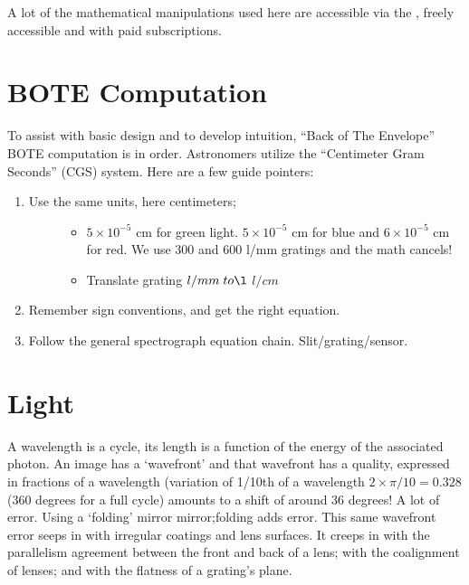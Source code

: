 \documentclass[letterpaper,10pt,english,openany,oneside]{sphinxmanual}
\begin{document}
\sphinxAtStartPar
A lot of the mathematical manipulations used here are accessible via
the  , freely accessible and with paid
subscriptions.


\section{BOTE Computation}
\label{\detokenize{physics:bote-computation}}
\sphinxAtStartPar
To assist with basic design and to develop intuition, “Back of The
Envelope” BOTE computation is in
order. Astronomers utilize the “Centimeter Gram Seconds” (CGS)
system. Here are a few guide pointers:
\begin{enumerate}
%
\item {} \begin{description}
\item[{Use the same units, here centimeters;}] \leavevmode\begin{itemize}
\item {} 
\sphinxAtStartPar
\(5 \times 10^{-5}\) cm for green light. \(5 \times 10^{-5}\) cm for blue and \(6 \times 10^{-5}\) cm for red. We use 300 and 600 l/mm gratings and the math cancels!

\item {} 
\sphinxAtStartPar
Translate grating \(l/mm\; to\l\) \(l/cm\)

\end{itemize}

\end{description}

\item {} 
\sphinxAtStartPar
Remember sign conventions, and get the right equation.

\item {} 
\sphinxAtStartPar
Follow the general spectrograph equation chain. Slit/grating/sensor.

\end{enumerate}


\section{Light}
\label{\detokenize{physics:light}}
\sphinxAtStartPar
A wavelength is a cycle, its length is a function of the energy of the
associated photon. An image has a ‘wavefront’ and that wavefront has a
quality, expressed in fractions of a wavelength (variation of 1/10th
of a wavelength \(2\times\pi/10 = 0.328\) (360 degrees for a full
cycle) amounts to a shift of around 36 degrees! A lot of error. Using
a ‘folding’ mirror mirror;folding adds error. This same
wavefront error seeps in with irregular coatings and lens surfaces.  It
creeps in with the parallelism agreement between the front and back of a
lens; with the co\sphinxhyphen{}alignment of lenses; and with the flatness of a
grating’s plane.
\end{document}
